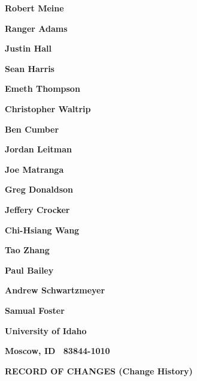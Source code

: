\documentclass[twoside,letterpaper]{article}
\begin{document}
{\centering{}\bfseries\color{black}
Robert Meine
\par}
{\centering{}\bfseries\color{black}
Ranger Adams
\par}
{\centering{}\bfseries\color{black}
Justin Hall
\par}
{\centering{}\bfseries\color{black}
Sean Harris
\par}
{\centering{}\bfseries\color{black}
Emeth Thompson
\par}
{\centering{}\bfseries\color{black}
Christopher Waltrip
\par}
{\centering{}\bfseries\color{black}
Ben Cumber
\par}
{\centering{}\bfseries\color{black}
Jordan Leitman
\par}
{\centering{}\bfseries\color{black}
Joe Matranga
\par}
{\centering{}\bfseries\color{black}
Greg Donaldson
\par}
{\centering{}\bfseries\color{black}
Jeffery Crocker
\par}
{\centering{}\bfseries\color{black}
Chi-Hsiang Wang
\par}
{\centering{}\bfseries\color{black}
Tao Zhang
\par}
{\centering{}\bfseries\color{black}
Paul Bailey
\par}
{\centering{}\bfseries\color{black}
Andrew Schwartzmeyer
\par}
{\centering{}\bfseries\color{black}
Samual Foster
\par}
{\centering{}\bfseries\color{black}
University of Idaho
\par}

{\centering{}\bfseries\color{black}
Moscow, ID \ 83844-1010
\par}


{\centering{}\bfseries\color{black}
RECORD OF CHANGES (Change History)
\par}
\end{document}
